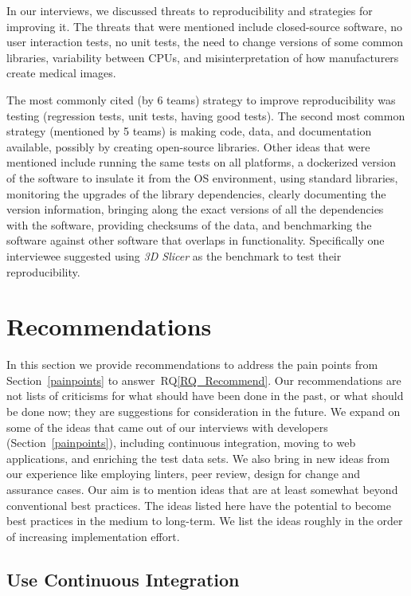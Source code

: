 \documentclass[final, 12pt, 3p, times]{elsarticle}
\newcommand{\rqref}[1]{RQ\ref{#1}}
\begin{document}
\begin{enumerate}
In our interviews, we discussed threats to reproducibility and strategies for
improving it.  The threats that were mentioned include closed-source software,
no user interaction tests, no unit tests, the need to change versions of some
common libraries, variability between CPUs, and misinterpretation of how
manufacturers create medical images. 

The most commonly cited (by 6 teams) strategy to improve reproducibility was
testing (regression tests, unit tests, having good tests). The second most
common strategy (mentioned by 5 teams) is making code, data, and documentation
available, possibly by creating open-source libraries.  Other ideas that were
mentioned include running the same tests on all platforms, a dockerized version
of the software to insulate it from the OS environment, using standard
libraries, monitoring the upgrades of the library dependencies, clearly
documenting the version information, bringing along the exact versions of all
the dependencies with the software, providing checksums of the data, and
benchmarking the software against other software that overlaps in functionality.
Specifically one interviewee suggested using \textit{3D Slicer} as the benchmark
to test their reproducibility.

\end{enumerate}

\section{Recommendations} \label{ch_recommendations}

In this section we provide recommendations to address the pain points from
Section~\ref{painpoints} to answer~\rqref{RQ_Recommend}.  Our recommendations
are not lists of criticisms for what should have been done in the past, or what
should be done now; they are suggestions for consideration in the future. We
expand on some of the ideas that came out of our interviews with developers
(Section~\ref{painpoints}), including continuous integration, moving to web
applications, and enriching the test data sets. We also bring in new ideas from
our experience like employing linters, peer review, design for change and
assurance cases.  Our aim is to mention ideas that are at least somewhat beyond
conventional best practices. The ideas listed here have the potential to become
best practices in the medium to long-term. We list the ideas roughly in the
order of increasing implementation effort.

\subsection{Use Continuous Integration} \label{Sec_ContinuousIntegration}
\end{document}
